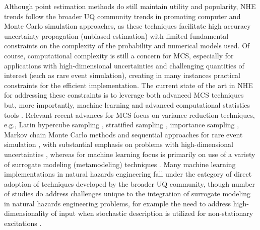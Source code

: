 Although point estimation methods do still maintain utility and popularity, NHE trends follow the broader UQ community trends in promoting computer and Monte Carlo simulation approaches, as these techniques facilitate high accuracy uncertainty propagation (unbiased estimation) with limited fundamental constraints on the complexity of the probability and numerical models used. Of course, computational complexity is still a concern for MCS, especially for applications with high-dimensional uncertainties and challenging quantities of interest (such as rare event simulation), creating in many instances practical constraints for the efficient implementation. The current state of the art in NHE for addressing these constraints is to leverage both advanced MCS techniques \citep{au2003subset,li2017system,bansal2018subset} but, more importantly, machine learning and advanced computational statistics tools \citep{echard2011akmcs, abbiati2017hierarchical, ding2018multifidelity, su2018efficient, wang2018bayesian}. Relevant recent advances for MCS focus on variance reduction techniques, e.g., Latin hypercube sampling \citep{vamvatsikos2014seismic}, stratified sampling \citep{jayaram2010efficient}, importance sampling \citep{papaioannou2018reliability}, Markov chain Monte Carlo methods \citep{au2003subset} and sequential approaches for rare event simulation \citep{jia2017new}, with substantial emphasis on problems with high-dimensional uncertainties \citep{au2003subset,wang2016crossentropybased}, whereas for machine learning focus is primarily on use of a variety of surrogate modeling (metamodeling) techniques \citep{stern2017accelerated, zhang2018adaptive, bernier2019fragility, gentile2020gaussian, le2020neural, zhang2020physicsguided}. Many machine learning implementations in natural hazards engineering fall under the category of direct adoption of techniques developed by the broader UQ community, though number of studies do address challenges unique to the integration of surrogate modeling in natural hazards engineering problems, for example the need to address high-dimensionality of input when stochastic description is utilized for non-stationary excitations \citep{gidaris2015kriging}.  

